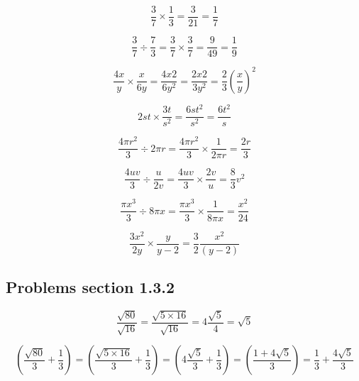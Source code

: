 \begin{equation}
  \frac{3}{7} \times \frac{1}{3} = \frac{3}{21} = \frac{1}{7}
\end{equation}

\begin{equation}
  \frac{3}{7} \div \frac{7}{3}  = \frac{3}{7} \times \frac{3}{7} = \frac{9}{49} = \frac{1}{9}
\end{equation}

\begin{equation}
  \frac{4x}{y} \times \frac{x}{6y} = \frac{4x{2}}{6y^{2}} = \frac{2x{2}}{3y^{2}} = \frac{2}{3} \left ( \frac{x}{y} \right )^{2}
\end{equation}

\begin{equation}
  2st \times \frac{3t}{s^{2}} = \frac{6st^{2}}{s^{2}} = \frac{6 t^{2}}{s}
\end{equation}

\begin{equation}
  \frac{4 \pi r^{2}}{3} \div 2 \pi r = \frac{4 \pi r^{2}}{3} \times \frac{1}{2 \pi r} = \frac{2r}{3}
\end{equation}

\begin{equation}
  \frac{4uv}{3} \div \frac{u}{2v} = \frac{4uv}{3} \times \frac{2v}{u} = \frac{8}{3}v^{2}
\end{equation}

\begin{equation}
  \frac{\pi x^{3}}{3} \div 8 \pi x =  \frac{\pi x^{3}}{3} \times \frac{ 1 }{8 \pi x} = \frac{x^{2}}{24}
\end{equation}

\begin{equation}
  \frac{3x^{2}}{2y} \times \frac{y}{y-2} = \frac{3}{2}  \frac{x^{2}}{ ( y-2)} 
\end{equation}

\subsection{Problems section 1.3.2}


\begin{equation}
  \frac{\sqrt{80}}{\sqrt{16}} = \frac{\sqrt{5 \times 16}}{\sqrt{16}} = 4\frac{\sqrt{5}}{4} =\sqrt{5} 
\end{equation}

\begin{equation}
 \left ( \frac{\sqrt{80}}{3} + \frac{1}{3} \right) = \left ( \frac{\sqrt{5 \times 16}}{3} + \frac{1}{3} \right) = \left ( 4\frac{\sqrt{5}}{3} + \frac{1}{3} \right) = \left ( \frac{1 + 4 \sqrt{5}}{3} \right ) = \frac{1}{3} + \frac{4 \sqrt{5}}{3} 
\end{equation}


